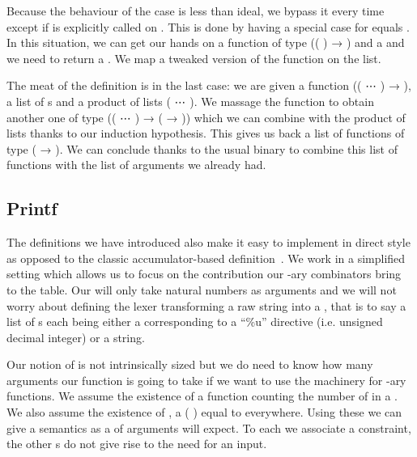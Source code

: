 {Because the behaviour of the  case is less than ideal, we bypass it
every time except if  is explicitly called on . This is
done by having a special case for  equals . In this situation,
we can get our hands on a function  of type
{((  ) → )} and a { } and we need to
return a { }. We map a tweaked version of the function on the list.


The meat of the definition is in the last case: we are given a function
{((    ⋯  ) → )}, a list of s
and a product of lists {(   ⋯   )}.
We massage the function to obtain another one of type
{((  ⋯  ) → ( → ))} which we can
combine with the product of lists thanks to our induction hypothesis. This gives
us back a list of functions of type {( → )}. We can conclude thanks
to the usual binary  to combine this list of functions with the list
of arguments we already had.


\subsection{Printf}\label{sec:printf}

The definitions we have introduced also make it easy to implement 
in direct style as opposed to the classic accumulator-based
definition~\cite{DBLP:conf/icfp/Augustsson98}. We work in a
simplified setting which allows us to focus on the contribution our -ary
combinators bring to the table. Our  will only take natural numbers
as arguments and we will not worry about defining the lexer transforming a raw
string into a , that is to say a list of s each being
either a  corresponding to a ``\%u'' directive (i.e. unsigned decimal
integer) or a  string.

\begin{minipage}[t]{0.25\textwidth}
\end{minipage}\begin{minipage}[t]{0.2\textwidth}
\end{minipage}

Our notion of  is not intrinsically sized but we do need to know
how many arguments our  function is going to take if we want to use
the machinery for -ary functions. We assume the existence of a 
function counting the number of  in a . We also assume the
existence of , a ( ) equal to  everywhere. Using
these we can give  a semantics as a  of arguments 
will expect. To each  we associate a  constraint, the other
s do not give rise to the need for an input.

}
